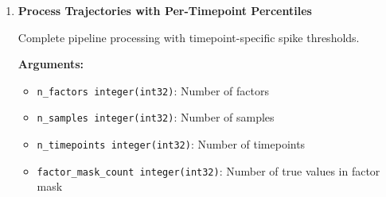 \begin{enumerate}
\begin{enumerate}
\begin{enumerate}
\begin{itemize}
                            \item \texttt{ierr integer(int32)}: Error code (for error
                                  details please check
                                  \hyperref[sec:error-handling]{error handling section})
                          \end{itemize}
                          \begin{lstlisting}[language=Fortran, caption={Spike Outlier Detection}]
call detect_outliers_spike(spike_contribs, n_timepoints, &
                        n_samples, thresholds, outlier_mask, ierr)
                          \end{lstlisting}
                  \end{enumerate}
                  
                  \textbf{For convenience, allocation-friendly versions are also available:}
                  \begin{itemize}
                    \item \texttt{calc\_integrated\_threshold\_alloc}: Handles internal allocation
                          and sorting
                          
                    \item \texttt{calc\_spike\_thresholds\_alloc}: Handles internal allocation
                          and sorting
                  \end{itemize}
                  
            \item \textbf{Process Trajectories with Per-Timepoint Percentiles}
                  
                  Complete pipeline processing with timepoint-specific spike thresholds.
                  
                  \textbf{Arguments:}
                  \begin{itemize}
                    \item \texttt{n\_factors integer(int32)}: Number of factors
                          
                    \item \texttt{n\_samples integer(int32)}: Number of samples
                          
                    \item \texttt{n\_timepoints integer(int32)}: Number of timepoints
                          
                    \item \texttt{factor\_mask\_count integer(int32)}: Number of true values
                          in factor mask
                          

\end{itemize}
\end{enumerate}
\end{enumerate}
